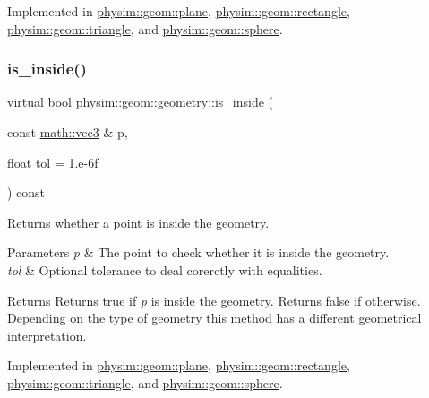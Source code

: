 Implemented in \hyperlink{classphysim_1_1geom_1_1plane_a2ec8e396f3e61e6c262236f560abfff5}{physim\+::geom\+::plane}, \hyperlink{classphysim_1_1geom_1_1rectangle_a574bb5afdcd7c6afca0bd5948e1f37a9}{physim\+::geom\+::rectangle}, \hyperlink{classphysim_1_1geom_1_1triangle_a0b3385fe699bddd1f4e57bfa917a567f}{physim\+::geom\+::triangle}, and \hyperlink{classphysim_1_1geom_1_1sphere_a6b569b7cd70b5b63936225263ce1c400}{physim\+::geom\+::sphere}.

\mbox{\label{classphysim_1_1geom_1_1geometry_ab7aa1a32927e96ed384a93b84fbd62b7}} 
\subsubsection{\texorpdfstring{is\+\_\+inside()}{is\_inside()}}
{\footnotesize\ttfamily virtual bool physim\+::geom\+::geometry\+::is\+\_\+inside (\begin{DoxyParamCaption}\item[{const \hyperlink{structphysim_1_1math_1_1vec3}{math\+::vec3} \&}]{p,  }\item[{float}]{tol = {\ttfamily 1.e-\/6f} }\end{DoxyParamCaption}) const\hspace{0.3cm}{\ttfamily [pure virtual]}}



Returns whether a point is inside the geometry. 


\begin{DoxyParams}{Parameters}
{\em p} & The point to check whether it is inside the geometry. \\
\hline
{\em tol} & Optional tolerance to deal corerctly with equalities. \\
\hline
\end{DoxyParams}
\begin{DoxyReturn}{Returns}
Returns true if {\itshape p} is inside the geometry. Returns false if otherwise. Depending on the type of geometry this method has a different geometrical interpretation. 
\end{DoxyReturn}


Implemented in \hyperlink{classphysim_1_1geom_1_1plane_a2a82c9b43f0883e0cfb7e49fe71b3434}{physim\+::geom\+::plane}, \hyperlink{classphysim_1_1geom_1_1rectangle_a58c9d1adb350b5c140069ff920a2a2b0}{physim\+::geom\+::rectangle}, \hyperlink{classphysim_1_1geom_1_1triangle_a225a095a4ae50eb2f591d126cfefaf71}{physim\+::geom\+::triangle}, and \hyperlink{classphysim_1_1geom_1_1sphere_a418c319892851c7a29e1a37e07a6811e}{physim\+::geom\+::sphere}.

